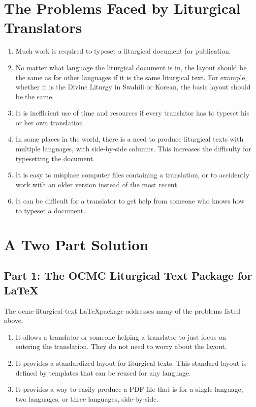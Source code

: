 \documentclass[]{memoir}
\begin{document}
\section{The Problems Faced by Liturgical Translators}
\begin{enumerate}
    \item Much work is required to typeset a liturgical document for publication.
    \item No matter what language the liturgical document is in, the layout should be the same as for other languages if it is the same liturgical text.  For example, whether it is the Divine Liturgy in Swahili or Korean, the basic layout should be the same.
    \item It is inefficient use of time and resources if every translator has to typeset his or her own translation.
    \item In some places in the world, there is a need to produce liturgical texts with multiple languages, with side-by-side columns.  This increases the difficulty for typesetting the document.
    \item It is easy to misplace computer files containing a translation, or to accidently work with an older version instead of the most recent.
    \item It can be difficult for a translator to get help from someone who knows how to typeset a document.
\end{enumerate}
\section{A Two Part Solution}
\subsection{Part 1: The OCMC Liturgical Text Package for \LaTeX}
The ocmc-liturgical-text \LaTeX package addresses many of the problems listed above.
\begin{enumerate}
    \item It allows a translator or someone helping a translator to just focus on entering the translation.  They do not need to worry about the layout.
    \item It provides a standardized layout for liturgical texts.  This standard layout is defined by templates that can be reused for any language.
    \item It provides a way to easily produce a PDF file that is for a single language, two languages, or three languages, side-by-side.
\end{enumerate}
\end{document}
